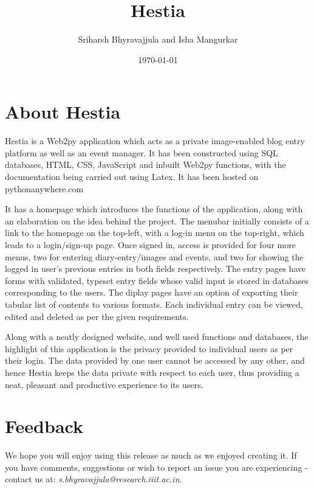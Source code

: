 \documentclass[11pt]{article}
\title{\textbf{Hestia}}
\author{Sriharsh Bhyravajjula and Isha Mangurkar}
\date{\today}
\begin{document}
\maketitle

\section{About Hestia}

Hestia is a Web2py application which acts as a private image-enabled blog entry platform as well as an event manager. It has been constructed using SQL databases, HTML, CSS, JavaScript and inbuilt Web2py functions, with the documentation being carried out using Latex. It has been hosted on pythonanywhere.com


It has a homepage which introduces the functions of the application, along with an elaboration on the idea behind the project. The menubar initially consists of a link to the homepage on the top-left, with a log-in menu on the top-right, which leads to a login/sign-up page. Once signed in, access is provided for four more menus, two for entering diary-entry/images and events, and two for showing the logged in user's previous entries in both fields respectively. The entry pages have forms with validated, typeset entry fields whose valid input is stored in databases corresponding to the users. The diplay pages have an option of exporting their tabular list of contents to various formats. Each individual entry can be viewed, edited and deleted as per the given requirements.


Along with a neatly designed website, and well used functions and databases, the highlight of this application is the privacy provided to individual users as per their login. The data provided by one user cannot be accessed by any other, and hence Hestia keeps the data private with respect to each user, thus providing a neat, pleasant and productive experience to its users. 

\section{Feedback}
We hope you will enjoy using this release as much as we enjoyed creating it. If you have comments, suggestions or wish to report an issue you are experiencing - contact us at: \emph{s.bhyravajjula@research.iiit.ac.in}.
\end{document}
